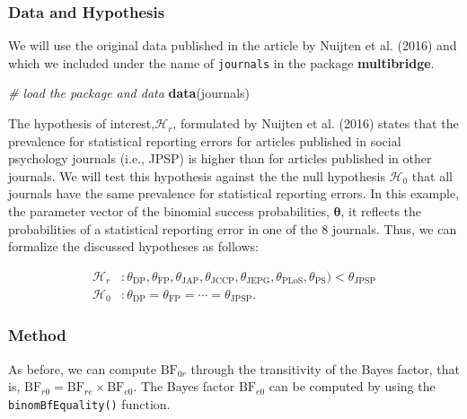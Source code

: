 \documentclass[
  english,
  man,floatsintext]{apa6}
\newenvironment{Shaded}{\begin{snugshade}}{\end{snugshade}}
\newcommand{\CommentTok}[1]{\textcolor[rgb]{0.56,0.35,0.01}{\textit{#1}}}
\newcommand{\KeywordTok}[1]{\textcolor[rgb]{0.13,0.29,0.53}{\textbf{#1}}}
\newcommand{\NormalTok}[1]{#1}
\begin{document}
\hypertarget{data-and-hypothesis-1}{%
\subsubsection{Data and Hypothesis}\label{data-and-hypothesis-1}}

We will use the original data published in the article by Nuijten et al. (2016) and which we included under the name of \texttt{journals} in the package \textbf{multibridge}.

\begin{Shaded}
\begin{Highlighting}[]
\CommentTok{\# load the package and data}
\KeywordTok{data}\NormalTok{(journals)}
\end{Highlighting}
\end{Shaded}

The hypothesis of interest,\(\mathcal{H}_r\), formulated by Nuijten et al. (2016) states that the prevalence for statistical reporting errors for articles published in social psychology journals (i.e., JPSP) is higher than for articles published in other journals. We will test this hypothesis against the the null hypothesis \(\mathcal{H}_0\) that all journals have the same prevalence for statistical reporting errors. In this example, the parameter vector of the binomial success probabilities, \(\boldsymbol{\theta}\), it reflects the probabilities of a statistical reporting error in one of the 8 journals. Thus, we can formalize the discussed hypotheses as follows:

\begin{align*}
    \mathcal{H}_r &: \theta_{\text{DP}}, \theta_{\text{FP}}, \theta_{\text{JAP}} , \theta_{\text{JCCP}} , \theta_{\text{JEPG}} , \theta_{\text{PLoS}}, \theta_{\text{PS}}) < \theta_{\text{JPSP}} \\
    \mathcal{H}_0 &: \theta_{\text{DP}} =  \theta_{\text{FP}} =  \cdots = \theta_{\text{JPSP}}.
\end{align*}

\hypertarget{method-1}{%
\subsubsection{Method}\label{method-1}}

As before, we can compute \(\text{BF}_{0r}\) through the transitivity of the Bayes factor, that is, \(\text{BF}_{r0} = \text{BF}_{re} \times \text{BF}_{e0}\). The Bayes factor \(\text{BF}_{e0}\) can be computed by using the \texttt{binomBfEquality()} function.
\end{document}
